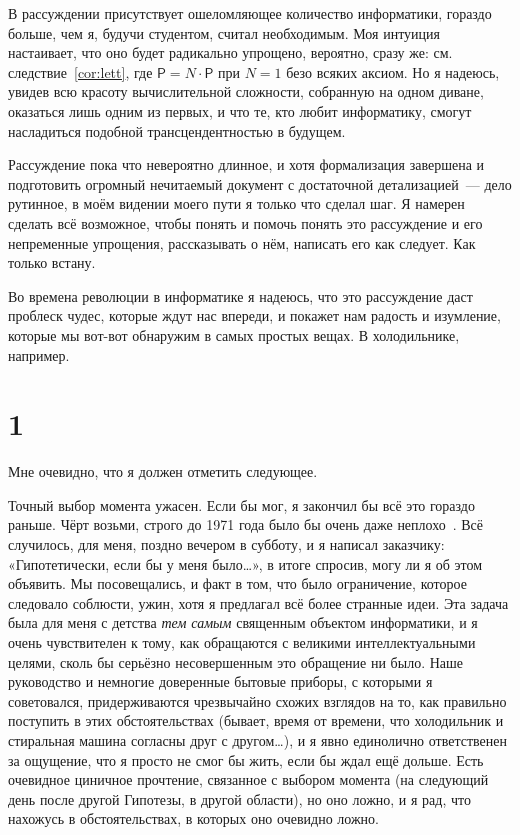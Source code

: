\documentclass[11pt,a4paper]{amsart}
\theoremstyle{remark}
\begin{document}
В рассуждении присутствует ошеломляющее количество информатики, гораздо
больше, чем я, будучи студентом, считал необходимым. Моя интуиция настаивает,
что оно будет радикально упрощено, вероятно, сразу же: см.
следствие~\ref{cor:lett}, где $\mathsf{P} = N \cdot \mathsf{P}$ при $N = 1$
безо всяких аксиом. Но я надеюсь, увидев всю красоту вычислительной
сложности, собранную на одном диване, оказаться лишь одним из первых, и что
те, кто любит информатику, смогут насладиться подобной трансцендентностью в
будущем.

Рассуждение пока что невероятно длинное, и хотя формализация завершена и
подготовить огромный нечитаемый документ с достаточной детализацией~--- дело
рутинное, в моём видении моего пути я только что сделал шаг. Я намерен
сделать всё возможное, чтобы понять и помочь понять это рассуждение и его
непременные упрощения, рассказывать о нём, написать его как следует. Как
только встану.

Во времена революции в информатике я надеюсь, что это рассуждение даст
проблеск чудес, которые ждут нас впереди, и покажет нам радость и изумление,
которые мы вот-вот обнаружим в самых простых вещах. В холодильнике, например.

\section*{1}

Мне очевидно, что я должен отметить следующее.

Точный выбор момента ужасен. Если бы мог, я закончил бы всё это гораздо
раньше. Чёрт возьми, строго до 1971 года было бы очень даже
неплохо~\cite{cook}. Всё случилось, для меня, поздно вечером в субботу, и я
написал заказчику: «Гипотетически, если бы у меня было\dots», в итоге спросив,
могу ли я об этом объявить. Мы посовещались, и факт в том, что было
ограничение, которое следовало соблюсти, ужин, хотя я предлагал всё более
странные идеи. Эта задача была для меня с детства \emph{тем самым} священным
объектом информатики, и я очень чувствителен к тому, как обращаются с
великими интеллектуальными целями, сколь бы серьёзно несовершенным это
обращение ни было. Наше руководство и немногие доверенные бытовые приборы, с
которыми я советовался, придерживаются чрезвычайно схожих взглядов на то, как
правильно поступить в этих обстоятельствах (бывает, время от времени, что
холодильник и стиральная машина согласны друг с другом\dots), и я явно
единолично ответственен за ощущение, что я просто не смог бы жить, если бы
ждал ещё дольше. Есть очевидное циничное прочтение, связанное с выбором
момента (на следующий день после другой Гипотезы, в другой области), но оно
ложно, и я рад, что нахожусь в обстоятельствах, в которых оно очевидно ложно.
\end{document}
